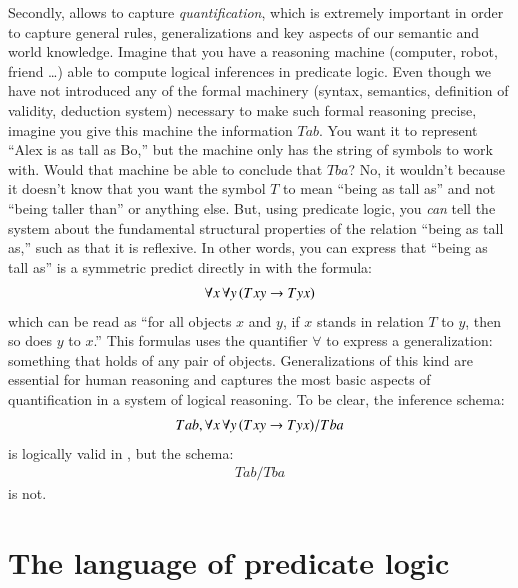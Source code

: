 \documentclass[nobib,nofonts]{tufte-handout}
\newcommand{\predlog}{\acro{PredLog}}
\begin{document}
Secondly, \predlog allows to capture \emph{quantification}, which is extremely important in order to capture general rules, generalizations and key aspects of our semantic and world knowledge.
Imagine that you have a reasoning machine (computer, robot, friend \dots) able to compute logical inferences in predicate logic.
Even though we have not introduced any of the formal machinery (syntax, semantics, definition of validity, deduction system) necessary to make such formal reasoning precise, imagine you give this machine the information $Tab$.
You want it to represent ``Alex is as tall as Bo,'' but the machine only has the string of symbols to work with.
Would that machine be able to conclude that $Tba$?
No, it wouldn't because it doesn't know that you want the symbol $T$ to mean ``being as tall as'' and not ``being taller than'' or anything else.
But, using predicate logic, you \emph{can} tell the system about the fundamental structural properties of the relation ``being as tall as,'' such as that it is reflexive.
In other words, you can express that ``being as tall as'' is a symmetric predict directly in \predlog with the formula:
\begin{align*}
 \forall x \thinspace \forall y \thinspace (Txy \rightarrow Tyx)
\end{align*}
which can be read as ``for all objects $x$ and $y$, if $x$ stands in relation $T$ to $y$, then so does $y$ to $x$.''
This formulas uses the quantifier \(\forall\) to express a generalization: something that holds of any pair of objects.
Generalizations of this kind are essential for human reasoning and \predlog captures the most basic aspects of quantification in a system of logical reasoning.
To be clear, the inference schema:
\begin{align*}
 Tab, \forall x \thinspace \forall y \thinspace (Txy \rightarrow Tyx) / Tba
\end{align*}
is logically valid in \predlog, but the schema:
\begin{align*}
 Tab / Tba
\end{align*}
is not.

\section{The language of predicate logic}
\end{document}
